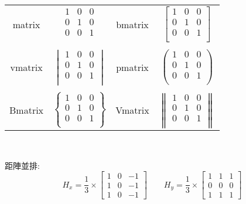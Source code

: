 \begin{center} 
\begin{tabular}{c c c c}%
  
   \extrarowheight=8pt 
  matrix & 
  $ \begin{matrix} 1&0&0\\ 0&1&0\\ 0&0&1\\ \end{matrix}
  $  
  &bmatrix	& 
  $\begin{bmatrix} 1&0&0\\ 0&1&0\\ 0&0&1\\ \end{bmatrix}
  $	\\  %
  \\
  vmatrix      & $\begin{vmatrix} 1&0&0\\ 0&1&0\\ 0&0&1\\ \end{vmatrix}$ & pmatrix & $\begin{pmatrix} 1&0&0\\ 0&1&0\\ 0&0&1\\ \end{pmatrix}$	\\
  \\
 Bmatrix       & $\begin{Bmatrix} 1&0&0\\ 0&1&0\\ 0&0&1\\ \end{Bmatrix}$    & Vmatrix	& $\begin{Vmatrix} 1&0&0\\ 0&1&0\\ 0&0&1\\ \end{Vmatrix}$ \\

\end{tabular}\\

\end{center}
\bigskip
距陣並排:
\begin{equation}
H_x=\frac{1}{3}\times{
\left[ \begin{array}{ccc}
1 & 0 & -1\\
1 & 0 & -1\\
1 & 0 & -1
\end{array} 
\right ]}
\qquad 
H_y=\frac{1}{3}\times{
\left[ \begin{array}{ccc}
1 & 1 & 1\\
0& 0 & 0\\
1 & 1 & 1
\end{array}
\right ]}
\end{equation}

